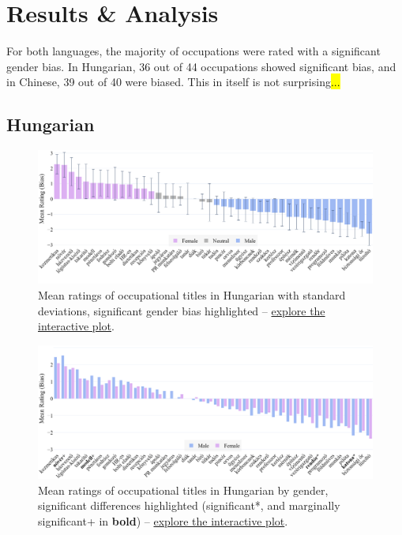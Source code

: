 \documentclass[11pt]{article}
\begin{document}
\section{Results \& Analysis}\label{sec:results}

For both languages, the majority of occupations were rated with a significant gender bias. In Hungarian, 36 out of 44 occupations showed significant bias, and in Chinese, 39 out of 40 were biased. This in itself is not surprising\hl{...}

\subsection{Hungarian}

\begin{figure}[!ht]
  \centering
  \includegraphics[width=\linewidth]{../occupations_hu}
  \caption{Mean ratings of occupational titles in Hungarian with standard deviations, significant gender bias highlighted -- \href{https://anonymous.4open.science/api/repo/occupational-bias-paclic39/file/occupations_hu.html?v=93359859}{explore the interactive plot}.}
  \label{fig:occupations_hu}
\end{figure}

\begin{figure}[tbp]
  \centering
  \includegraphics[width=\linewidth]{../occupations_hu_gender}
  \caption{Mean ratings of occupational titles in Hungarian by gender, significant differences highlighted (significant*, and marginally significant+ in \textbf{bold}) -- \href{https://anonymous.4open.science/api/repo/occupational-bias-paclic39/file/occupations_hu_gender.html?v=cf836c31}{explore the interactive plot}.}
  \label{fig:occupations_hu_gender}
\end{figure}
\end{document}
